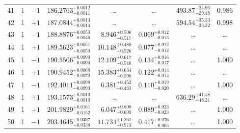 \begin{table*}[!]
\begin{tabular}{llcrrlrc}
41 & 1 & $-1$ & $    186.2763_{-      0.0011}^{+      0.0012}$ & \multicolumn{1}{c}{\dots} & \multicolumn{1}{c}{\dots} & $      493.87_{-       29.48}^{+       24.96}$ & 0.986\\[1pt]
42 & 1 & $+1$ & $    187.0844_{-      0.0014}^{+      0.0013}$ & \multicolumn{1}{c}{\dots} & \multicolumn{1}{c}{\dots} & $      594.54_{-       33.32}^{+       35.33}$ & 0.998 \\[1pt]
43 & 1 & $-1$ & $    188.8876_{-      0.0046}^{+      0.0050}$ & $       8.946_{-       0.517}^{+       0.506}$ & $       0.069_{-       0.013}^{+       0.012}$ & \multicolumn{1}{c}{\dots} & \dots \\[1pt]
44 & 1 & $+1$ & $    189.5623_{-      0.0050}^{+      0.0051}$ & $      10.148_{-       0.526}^{+       0.488}$ & $       0.077_{-       0.012}^{+       0.012}$ & \multicolumn{1}{c}{\dots} & \dots \\[1pt]
45 & 1 & $-1$ & $    190.5506_{-      0.0090}^{+      0.0090}$ & $      12.109_{-       0.540}^{+       0.617}$ & $       0.134_{-       0.017}^{+       0.016}$ & \multicolumn{1}{c}{\dots} & 1.000\\[1pt]
46 & 1 & $+1$ & $    190.9452_{-      0.0070}^{+      0.0068}$ & $      15.383_{-       0.598}^{+       0.634}$ & $       0.122_{-       0.014}^{+       0.014}$ & \multicolumn{1}{c}{\dots} & \dots \\[1pt]
47 & 1 & $-1$ & $    192.4011_{-      0.0093}^{+      0.0098}$ & $       6.381_{-       0.433}^{+       0.452}$ & $       0.110_{-       0.020}^{+       0.019}$ & \multicolumn{1}{c}{\dots} & 1.000\\[1pt] 
48 & 1 & $+1$ & $    193.1573_{-      0.0010}^{+      0.0010}$ & \multicolumn{1}{c}{\dots} & \multicolumn{1}{c}{\dots} & $      636.29_{-       48.21}^{+       41.58}$ & \dots \\[1pt]

49 & 1 & $+1$ & $    201.9829_{-      0.0152}^{+      0.0161}$ & $       6.047_{-       0.693}^{+       0.808}$ & $       0.089_{-       0.023}^{+       0.023}$ & \multicolumn{1}{c}{\dots} & 1.000\\[1pt]
50 & 1 & $-1$ & $    203.4645_{-      0.0338}^{+      0.0397}$ & $      11.734_{-       0.973}^{+       1.261}$ & $       0.417_{-       0.065}^{+       0.076}$ & \multicolumn{1}{c}{\dots} & 1.000\\[1pt] 
\hline
\end{tabular}
\end{table*}

